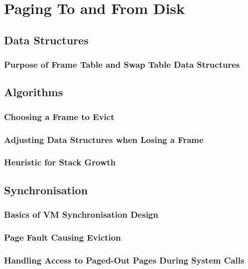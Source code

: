 \documentclass{article}
\renewcommand{\_}{\char`_}
\begin{document}
\section{Paging To and From Disk}

\subsection{Data Structures}

\subsubsection{Purpose of Frame Table and Swap Table Data Structures}

\subsection{Algorithms}

\subsubsection{Choosing a Frame to Evict}

\subsubsection{Adjusting Data Structures when Losing a Frame}

\subsubsection{Heuristic for Stack Growth}

\subsection{Synchronisation}

\subsubsection{Basics of VM Synchronisation Design}

\subsubsection{Page Fault Causing Eviction}

\subsubsection{Handling Access to Paged-Out Pages During System Calls}
\end{document}

